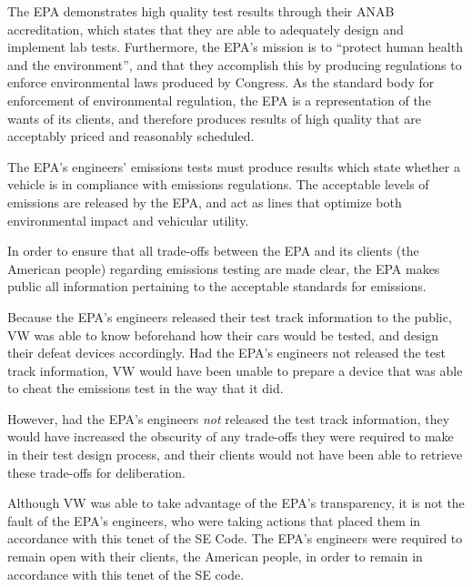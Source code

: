 The EPA demonstrates high quality test results through their ANAB accreditation\cite{anab_accreditation}, which states that they are able to adequately design and implement lab tests. Furthermore, the EPA's mission is to ``protect human health and the environment'', and that they accomplish this by producing regulations to enforce environmental laws produced by Congress\cite{epa_mission}. As the standard body for enforcement of environmental regulation, the EPA is a representation of the wants of its clients, and therefore produces results of high quality that are acceptably priced and reasonably scheduled.

The EPA's engineers' emissions tests must produce results\cite{epa_ghg_report} which state whether a vehicle is in compliance with emissions regulations. The acceptable levels of emissions are released by the EPA\cite{emissions_standards}, and act as lines that optimize both environmental impact and vehicular utility.

In order to ensure that all trade-offs between the EPA and its clients (the American people) regarding emissions testing are made clear, the EPA makes public all information pertaining to the acceptable standards for emissions\cite{emissions_standards}.

Because the EPA's engineers released their test track information to the public\cite{emissions_standards}, VW was able to know beforehand how their cars would be tested\cite{emissions_cars_affected}, and design their defeat devices accordingly. Had the EPA's engineers not released the test track information, VW would have been unable to prepare a device that was able to cheat the emissions test in the way that it did.

However, had the EPA's engineers \textit{not} released the test track information\cite{emissions_standards}, they would have increased the obscurity of any trade-offs they were required to make in their test design process, and their clients would not have been able to retrieve these trade-offs for deliberation.

Although VW was able to take advantage of the EPA's transparency\cite{emissions_cars_affected}, it is not the fault of the EPA's engineers, who were taking actions that placed them in accordance with this tenet of the SE Code\cite{emissions_standards}. The EPA's engineers were required to remain open with their clients, the American people, in order to remain in accordance with this tenet of the SE code.